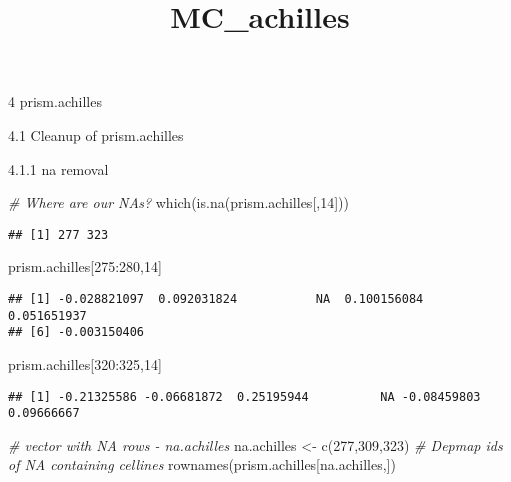 \documentclass[
]{article}
\title{MC\_achilles}
\author{}
\date{\vspace{-2.5em}}
\newenvironment{Shaded}{\begin{snugshade}}{\end{snugshade}}
\newcommand{\CommentTok}[1]{\textcolor[rgb]{0.56,0.35,0.01}{\textit{#1}}}
\newcommand{\DecValTok}[1]{\textcolor[rgb]{0.00,0.00,0.81}{#1}}
\newcommand{\FunctionTok}[1]{\textcolor[rgb]{0.00,0.00,0.00}{#1}}
\newcommand{\NormalTok}[1]{#1}
\newcommand{\OtherTok}[1]{\textcolor[rgb]{0.56,0.35,0.01}{#1}}
\newcommand{\SpecialCharTok}[1]{\textcolor[rgb]{0.00,0.00,0.00}{#1}}
\begin{document}
\maketitle

4 prism.achilles

4.1 Cleanup of prism.achilles

4.1.1 na removal

\begin{Shaded}
\begin{Highlighting}[]
\CommentTok{\# Where are our NAs?}
\FunctionTok{which}\NormalTok{(}\FunctionTok{is.na}\NormalTok{(prism.achilles[,}\DecValTok{14}\NormalTok{]))}
\end{Highlighting}
\end{Shaded}

\begin{verbatim}
## [1] 277 323
\end{verbatim}

\begin{Shaded}
\begin{Highlighting}[]
\NormalTok{prism.achilles[}\DecValTok{275}\SpecialCharTok{:}\DecValTok{280}\NormalTok{,}\DecValTok{14}\NormalTok{]}
\end{Highlighting}
\end{Shaded}

\begin{verbatim}
## [1] -0.028821097  0.092031824           NA  0.100156084  0.051651937
## [6] -0.003150406
\end{verbatim}

\begin{Shaded}
\begin{Highlighting}[]
\NormalTok{prism.achilles[}\DecValTok{320}\SpecialCharTok{:}\DecValTok{325}\NormalTok{,}\DecValTok{14}\NormalTok{]}
\end{Highlighting}
\end{Shaded}

\begin{verbatim}
## [1] -0.21325586 -0.06681872  0.25195944          NA -0.08459803  0.09666667
\end{verbatim}

\begin{Shaded}
\begin{Highlighting}[]
\CommentTok{\# vector with NA rows {-} na.achilles}
\NormalTok{na.achilles }\OtherTok{\textless{}{-}} \FunctionTok{c}\NormalTok{(}\DecValTok{277}\NormalTok{,}\DecValTok{309}\NormalTok{,}\DecValTok{323}\NormalTok{)}
\CommentTok{\# Depmap ids of NA containing cellines}
\FunctionTok{rownames}\NormalTok{(prism.achilles[na.achilles,])}
\end{Highlighting}
\end{Shaded}
\end{document}

